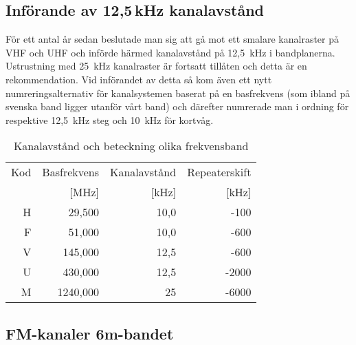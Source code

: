 \subsection{Införande av 12,5\,kHz kanalavstånd}

För ett antal år sedan beslutade man sig att gå mot ett smalare kanalraster på
VHF och UHF och införde härmed kanalavstånd på 12,5~kHz i bandplanerna.
Ustrustning med 25~kHz kanalraster är fortsatt tillåten och detta är en
rekommendation. Vid införandet av detta så kom även ett nytt
numreringsalternativ för kanalsystemen baserat på en basfrekvens (som ibland
på svenska band ligger utanför vårt band) och därefter numrerade man i ordning
för respektive 12,5~kHz steg och 10~kHz för kortvåg.

\begin{table}[h]
\centering
\begin{tabular}{rrrr}
Kod & Basfrekvens & Kanalavstånd & Repeaterskift \\
    & [MHz]       & [kHz]        & [kHz] \\ \hline
H & 29,500 & 10,0 & -100 \\
F & 51,000 & 10,0 & -600 \\
V & 145,000& 12,5 & -600 \\
U & 430,000& 12,5 & -2000 \\
M & 1240,000 & 25 & -6000 \\
\end{tabular}
\label{tab:kanalavstand}
\caption{Kanalavstånd och beteckning olika frekvensband}
\end{table}

\subsection{FM-kanaler 6m-bandet}

